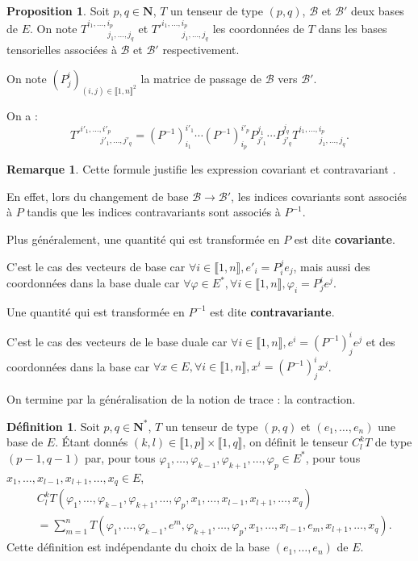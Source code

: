 \documentclass[12pt,a4paper]{article}
\theoremstyle{definition}
\newtheorem{prop}[thm]{Proposition}
\newtheorem{defn}[thm]{Définition}
\newtheorem{rqe}[thm]{Remarque}
\begin{document}
\begin{prop}
Soit $p,q\in\mathbf{N}$, $T$ un tenseur de type $(p,q)$, $\mathcal{B}$ et $\mathcal{B}'$ deux bases de $E$. On note $T^{i_1,\ldots,i_p}_{\;\;\qquad j_1,\ldots,j_q}$ et $T'^{i_1,\ldots,i_p}_{\;\;\qquad j_1,\ldots,j_q}$ les coordonnées de $T$ dans les bases tensorielles associées à $\mathcal{B}$ et $\mathcal{B}'$ respectivement.

On note $\left(P_{j}^i\right)_{(i,j)\in\llbracket 1,n\rrbracket^2}$ la matrice de passage de $\mathcal{B}$ vers $\mathcal{B}'$.

On a :
$$
T'^{i'_1,\ldots,i'_p}_{\;\;\qquad j'_1,\ldots,j'_q}=\left(P^{-1}\right)^{i'_1}_{i_1}\cdots\left(P^{-1}\right)^{i'_p}_{i_p}P^{j_1}_{j'_1}\cdots P^{j_q}_{j'_q}T^{i_1,\ldots,i_p}_{\;\;\qquad j_1,\ldots,j_q}.
$$
\end{prop}
\begin{rqe}
Cette formule justifie les expression \og covariant \fg{} et \og contravariant \fg{}.

En effet, lors du changement de base $\mathcal{B}\to\mathcal{B}'$, les indices covariants sont associés à $P$ tandis que les indices contravariants sont associés à $P^{-1}$.

Plus généralement, une quantité qui est transformée en $P$ est dite \textbf{covariante}.

C'est le cas des vecteurs de base car $\forall i\in\llbracket 1,n\rrbracket,e'_i=P_i^je_j$, mais aussi des coordonnées dans la base duale car $\forall\varphi\in E^*,\forall i\in\llbracket 1,n\rrbracket,\varphi_i=P_j^ie^j$.

Une quantité qui est transformée en $P^{-1}$ est dite \textbf{contravariante}.

C'est le cas des vecteurs de le base duale car $\forall i\in\llbracket 1,n\rrbracket,e^i=\left(P^{-1}\right)^i_je^j$ et des coordonnées dans la base car $\forall x\in E, \forall i\in\llbracket 1,n\rrbracket, x^i=\left(P^{-1}\right)^i_jx^j$.
\end{rqe}
On termine par la généralisation de la notion de trace : la contraction.
\begin{defn}
Soit $p,q\in\mathbf{N}^*$, $T$ un tenseur de type $(p,q)$ et $(e_1,\ldots,e_n)$ une base de $E$. Étant donnés $(k,l)\in\llbracket 1,p\rrbracket\times\llbracket 1,q\rrbracket$, on définit le tenseur $C^k_lT$ de type $(p-1,q-1)$ par, pour tous $\varphi_1,\ldots,\varphi_{k-1},\varphi_{k+1},\ldots,\varphi_p\in E^*$, pour tous $x_1,\ldots,x_{l-1},x_{l+1},\ldots,x_q\in E$,
\begin{align*}
&C^k_lT(\varphi_1,\ldots,\varphi_{k-1},\varphi_{k+1},\ldots,\varphi_p,x_1,\ldots,x_{l-1},x_{l+1},\ldots,x_q)\\&=\sum\limits_{m=1}^nT(\varphi_1,\ldots,\varphi_{k-1},e^m,\varphi_{k+1},\ldots,\varphi_p,x_1,\ldots,x_{l-1},e_m,x_{l+1},\ldots,x_q).
\end{align*}
Cette définition est indépendante du choix de la base $(e_1,\ldots,e_n)$ de $E$.
\end{defn}
\end{document}
